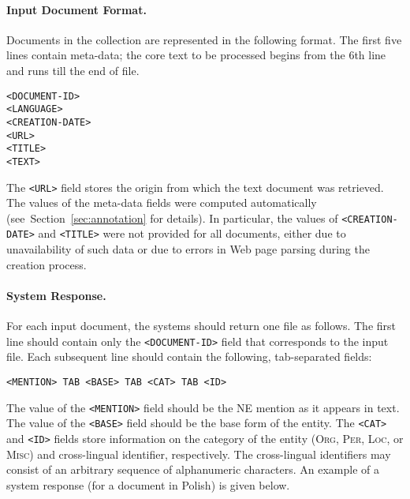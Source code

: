 \documentclass[11pt]{article}
\begin{document}
\paragraph{Input Document Format.}
\label{subsec:input}
%
Documents in the collection are represented in the following format.  The {first five
  lines} contain meta-data; the core text to be processed begins from the 6th line and runs
till the end of file.

\begin{small}
\begin{verbatim}
<DOCUMENT-ID>
<LANGUAGE>
<CREATION-DATE>
<URL>
<TITLE>
<TEXT>
\end{verbatim}
\end{small}

\noindent The \verb+<URL>+ field stores the origin from which the text document was retrieved.
The values of the meta-data fields were computed automatically
(see~Section~\ref{sec:annotation} for details). In particular, the values of
\verb+<CREATION-DATE>+ and \verb+<TITLE>+ were not provided for all documents, either due to
unavailability of such data or due to errors in Web page parsing during the creation process.

\paragraph{System Response.}
\label{subsec:input}
%
For each input document, the systems should return one file as follows.  The first line should
contain only the \verb+<DOCUMENT-ID>+ field that corresponds to the input file.  Each
subsequent line should contain the following, tab-separated fields:

\begin{small}
\begin{verbatim}
<MENTION> TAB <BASE> TAB <CAT> TAB <ID>
\end{verbatim}
\end{small}

\noindent The value of the \verb+<MENTION>+ field should be the NE mention as it appears in
text.  The value of the \verb+<BASE>+ field should be the base form of the entity.  The
\verb+<CAT>+ and \verb+<ID>+ fields store information on the category of the entity
(\textsc{Org}, \textsc{Per}, \textsc{Loc}, or \textsc{Misc}) and cross-lingual identifier,
respectively.  The cross-lingual identifiers may consist of an arbitrary sequence of
alphanumeric characters.  An example of a system response (for a document in Polish) is given
below.
\end{document}
